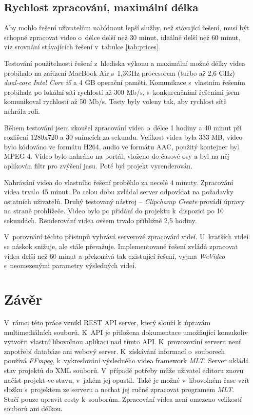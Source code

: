 \section{Rychlost zpracování, maximální délka}
Aby mohlo řešení uživatelům nabídnout lepší služby, než stávající řešení, musí být schopné zpracovat video o~délce delší než 30 minut, ideálně delší než 60 minut, viz srovnání stávajících řešení v~tabulce \ref{tab:prices}.

Testování použitelnosti řešení z~hlediska výkonu a maximální možné délky videa probíhalo na zařízení MacBook Air s~1,3GHz procesorem (turbo až 2,6 GHz) \textit{dual-core Intel Core i5} a 4 GB operační paměti. Komunikace s~vlastním řešením probíhala po lokální síti rychlostí až 300 Mb/s, s~konkurenčními řešeními jsem komunikoval rychlostí až 50 Mb/s. Testy byly voleny tak, aby rychlost sítě nehrála roli.

Během testování jsem zkoušel zpracování videa o~délce 1 hodiny a 40 minut při rozlišení 1280x720 a 30 snímcích za sekundu. Velikost videa byla 333 MB, video bylo kódováno ve formátu H264, audio ve formátu AAC, použitý kontejner byl MPEG-4. Video bylo nahráno na portál, vloženo do časové osy a byl na něj aplikován filtr pro zvýšení jasu. Poté byl projekt vyrenderován.

Nahrávání videa do vlastního řešení proběhlo za necelé 4 minuty. Zpracování videa trvalo 45 minut. Po celou dobu zvládal server odpovídat na požadavky ostatních uživatelů. Druhý testovaný nástroj -- \textit{Clipchamp Create} provádí úpravy na straně prohlížeče. Video bylo po přidání do projektu k~dispozici po 10 sekundách. Renderování videa ovšem trvalo přibližně 2,5 hodiny.

V~porovnání těchto přístupů vyhrává serverové zpracování videí. U~kratších videí se náskok snižuje, ale stále převažuje. Implementované řešení zvládá zpracovat videa delší než 60 minut a překonává tak existující řešení, vyjma \textit{WeVideo} s~neomezenými parametry výsledných videí.

\chapter{Závěr}
V~rámci této práce vznikl REST API server, který slouží k~úpravám multimediálních souborů. K~API je přiložena dokumentace umožňující komukoliv vytvořit vlastní libovolnou aplikaci nad tímto API. K~provozování serveru není zapotřebí databáze ani webový server. K~získávání informací o~souborech používá \textit{FFmpeg}, k~vykreslování výsledného videa framework \textit{MLT}. Server ukládá stav projektů do XML souborů. V~případě potřeby může uživatel editoru znovu načíst projekt ve stavu, v~jakém jej opustil. Také je možné v~libovolném čase vzít složku s~projektem ze serveru a nechat jej ručně zpracovat programem \textit{MLT}. Stačí pouze upravit cesty k~souborům. Zpracování videa není omezeno velikostí souborů ani délkou.

